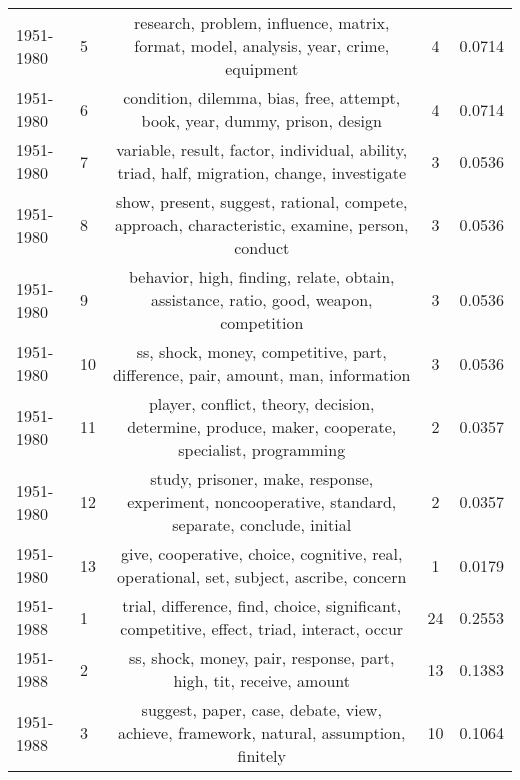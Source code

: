 \begin{tabular}{llccc}
 1951-1980 &               5 &                         research, problem, influence, matrix, format, model, analysis, year, crime, equipment &                4 &                  0.0714 \\
 1951-1980 &               6 &                                    condition, dilemma, bias, free, attempt, book, year, dummy, prison, design &                4 &                  0.0714 \\
 1951-1980 &               7 &                    variable, result, factor, individual, ability, triad, half, migration, change, investigate &                3 &                  0.0536 \\
 1951-1980 &               8 &                 show, present, suggest, rational, compete, approach, characteristic, examine, person, conduct &                3 &                  0.0536 \\
 1951-1980 &               9 &                         behavior, high, finding, relate, obtain, assistance, ratio, good, weapon, competition &                3 &                  0.0536 \\
 1951-1980 &              10 &                               ss, shock, money, competitive, part, difference, pair, amount, man, information &                3 &                  0.0536 \\
 1951-1980 &              11 &             player, conflict, theory, decision, determine, produce, maker, cooperate, specialist, programming &                2 &                  0.0357 \\
 1951-1980 &              12 &            study, prisoner, make, response, experiment, noncooperative, standard, separate, conclude, initial &                2 &                  0.0357 \\
 1951-1980 &              13 &                       give, cooperative, choice, cognitive, real, operational, set, subject, ascribe, concern &                1 &                  0.0179 \\
 \midrule
 1951-1988 &               1 &                     trial, difference, find, choice, significant, competitive, effect, triad, interact, occur &               24 &                  0.2553 \\
 1951-1988 &               2 &                                            ss, shock, money, pair, response, part, high, tit, receive, amount &               13 &                  0.1383 \\
 1951-1988 &               3 &                         suggest, paper, case, debate, view, achieve, framework, natural, assumption, finitely &               10 &                  0.1064 \\

\end{tabular}

